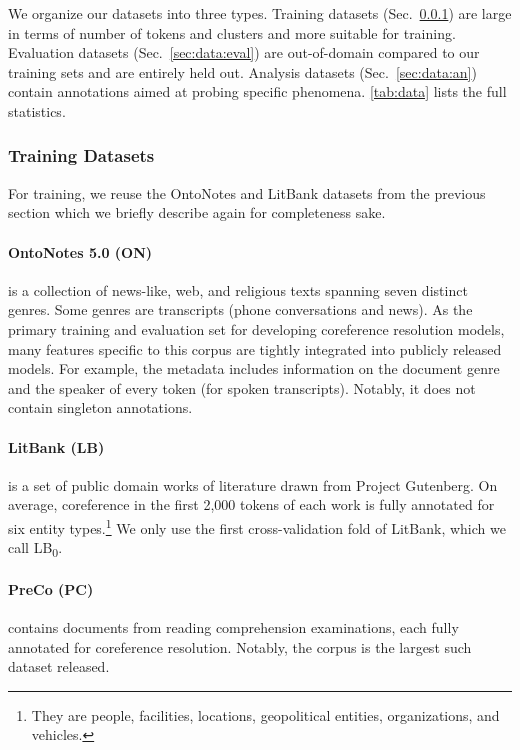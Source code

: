 \documentclass[12pt]{thesis-umich}[thesis]
\begin{document}
We organize our datasets into three types. Training datasets (Sec.~\ref{sec:data:train}) are large in terms of number of tokens and clusters and more suitable for training. Evaluation datasets (Sec.~\ref{sec:data:eval}) are out-of-domain compared to our training sets and are entirely held out. Analysis datasets (Sec.~\ref{sec:data:an}) contain annotations aimed at probing specific phenomena. \autoref{tab:data} lists the full statistics.

\subsubsection{Training Datasets}
\label{sec:data:train}
For training, we reuse the OntoNotes and LitBank datasets from the previous section which we briefly describe again for completeness sake. 

\paragraph{OntoNotes 5.0 (ON)} \cite{weischedel2013ontonotes} is a collection of news-like, web, and religious texts spanning seven distinct genres. Some genres are transcripts (phone conversations and news). As the primary training and evaluation set for developing coreference resolution models, many features specific to this corpus are tightly integrated into publicly released models. For example, the metadata includes information on the document genre and the speaker of every token (for spoken transcripts). Notably, it does not contain singleton annotations. 

\paragraph{LitBank (LB)} \cite{bamman2019annotated} is a set of public domain works of literature drawn from Project Gutenberg. On average, coreference in the first 2,000 tokens of each work is fully annotated for six entity types.\footnote{They are people, facilities, locations, geopolitical entities, organizations, and vehicles.} We only use the first cross-validation fold of LitBank, which we call LB\textsubscript{0}.

\paragraph{PreCo (PC)} \cite{chen-etal-2018-preco} contains documents from reading comprehension examinations, each fully annotated for coreference resolution. Notably, the corpus is the largest such dataset released. 
\end{document}
